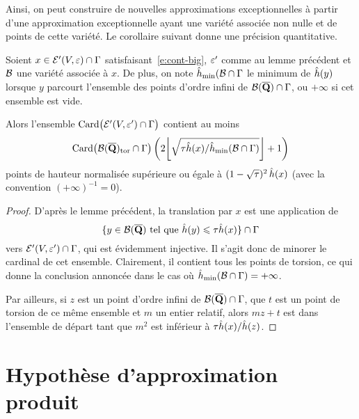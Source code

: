 Ainsi, on peut construire de nouvelles approximations exceptionnelles à partir
d'une approximation exceptionnelle ayant une variété associée non nulle et de
points de cette variété. Le corollaire suivant donne une précision
quantitative.

\begin{coro}
  Soient \( x \in \mathcal E'(V, \varepsilon) \cap \Gamma \)
  satisfaisant~\eqref{e:cont-big}, \( \varepsilon' \) comme au lemme précédent et \(
    \mathcal B \) une variété associée à \( x \). De plus, on note
  \( \hat h_{\mathrm{min}}(\mathcal B \cap \Gamma \) le minimum de \( \hat h (y) \) lorsque \( y \)
  parcourt l'ensemble des points d'ordre infini de
  \( \mathcal B(\overline{{\mathbf{Q}}}) \cap \Gamma \), ou \( +\infty \) si cet ensemble est vide.

  Alors l'ensemble
  \(
    \operatorname{Card} \bigl( \mathcal E'(V, \varepsilon') \cap \Gamma \bigr)
  \) contient au moins
  \begin{equation}
    \card \bigl( \vai(\Qbar)_\torsion \cap \grp \bigr)
    \left(
      2 \floor*{ \sqrt{ \tau \hautn x / \hmin(\vai \cap \grp) } } + 1
    \right)
  \end{equation}
  points de hauteur normalisée supérieure ou égale à
  \( (1-\sqrt\tau)^{2} \, \hat h (x) \) (avec la convention \( (+\infty)^{-1} =
    0 \)).
\end{coro}

\begin{proof}
  D'après le lemme précédent, la translation par \( x \) est une application
  de
  \begin{equation}
    \lbrace
      y \in \mathcal B(\overline{{\mathbf{Q}}})
      \text{ tel que }
      \hat h (y) \leqslant \tau \hat h (x)
    \rbrace
    \cap \Gamma
  \end{equation}
  vers \( \mathcal E'(V, \varepsilon') \cap \Gamma \), qui est évidemment injective. Il
  s'agit donc de minorer le cardinal de cet ensemble. Clairement, il contient
  tous les points de torsion, ce qui donne la conclusion annoncée dans le cas
  où \( \hat h_{\mathrm{min}}(\mathcal B \cap \Gamma) = + \infty \).

  Par ailleurs, si \( z \) est un point d'ordre infini de
  \( \mathcal B(\overline{{\mathbf{Q}}}) \cap \Gamma \), que \( t \) est un point de torsion de ce même
  ensemble et \( m \) un entier relatif, alors \( m z + t \) est dans
  l'ensemble de départ tant que \( m^2 \) est inférieur à
  \( \tau \hat h (x) / \hat h (z) \).
\end{proof}




\section{Hypothèse d'approximation produit}
\label{sec:ha-prod}

